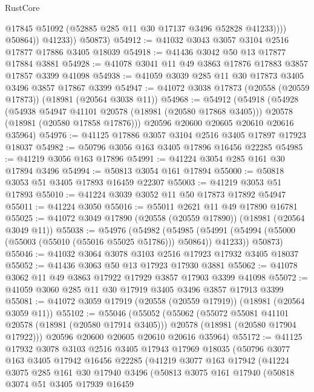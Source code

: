 \begin{lexlean}{RustCore}
\begin{coremodule}
                    @17845
                    @51092
                    (@52885 @285 @11 @30 @17137 @3496 @52828 @41233))))
              @50864))
          @41233))
      @50873)
@54912 := @41032 @3043 @3057 @3104 @2516 @17877 @17886 @3405 @18039
@54918 := @41436 @3042 @50 @13 @17877 @17884 @3881
@54928 := @41078 @3041 @11 @49 @3863 @17876 @17883 @3857 @17857 @3399 @41098
@54938 := @41059 @3039 @285 @11 @30 @17873 @3405 @3496 @3857 @17867 @3399
@54947 := @41072 @3038 @17873 (@20558 (@20559 @17873)) (@18981 (@20564 @3038 @11))
@54968 := @54912
    (@54918
      (@54928
        (@54938 @54947 @41101 @20578 (@18981 (@20580 @17868 @3405)))
        @20578
        (@18981 (@20580 @17858 @17876)))
      @20596
      @20600
      @20605
      @20610
      @20616
      @35964)
@54976 := @41125 @17886 @3057 @3104 @2516 @3405 @17897 @17923 @18037
@54982 := @50796 @3056 @163 @3405 @17896 @16456 @22285
@54985 := @41219 @3056 @163 @17896
@54991 := @41224 @3054 @285 @161 @30 @17894 @3496
@54994 := @50813 @3054 @161 @17894
@55000 := @50818 @3053 @51 @3405 @17893 @16459 @22307
@55003 := @41219 @3053 @51 @17893
@55010 := @41224 @3039 @3052 @11 @50 @17873 @17892 @54947
@55011 := @41224 @3050
@55016 := @55011 @2621 @11 @49 @17890 @16781
@55025 := @41072 @3049 @17890 (@20558 (@20559 @17890)) (@18981 (@20564 @3049 @11))
@55038 := @54976
    (@54982
      (@54985 (@54991 (@54994 (@55000 (@55003 (@55010 (@55016 @55025 @51786))) @50864)) @41233))
      @50873)
@55046 := @41032 @3064 @3078 @3103 @2516 @17923 @17932 @3405 @18037
@55052 := @41436 @3063 @50 @13 @17923 @17930 @3881
@55062 := @41078 @3062 @11 @49 @3863 @17922 @17929 @3857 @17903 @3399 @41098
@55072 := @41059 @3060 @285 @11 @30 @17919 @3405 @3496 @3857 @17913 @3399
@55081 := @41072 @3059 @17919 (@20558 (@20559 @17919)) (@18981 (@20564 @3059 @11))
@55102 := @55046
    (@55052
      (@55062
        (@55072 @55081 @41101 @20578 (@18981 (@20580 @17914 @3405)))
        @20578
        (@18981 (@20580 @17904 @17922)))
      @20596
      @20600
      @20605
      @20610
      @20616
      @35964)
@55172 := @41125
    @17932
    @3078
    @3103
    @2516
    @3405
    @17943
    @17969
    @18035
    (@50796
      @3077
      @163
      @3405
      @17942
      @16456
      @22285
      (@41219
        @3077
        @163
        @17942
        (@41224
          @3075
          @285
          @161
          @30
          @17940
          @3496
          (@50813
            @3075
            @161
            @17940
            (@50818
              @3074
              @51
              @3405
              @17939
              @16459

\end{coremodule}
\end{lexlean}

